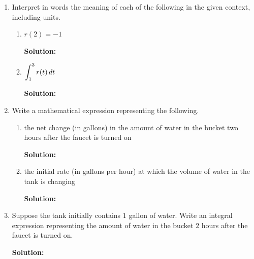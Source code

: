 \documentclass[10pt]{article}
\newcommand{\solution}{%
  \vspace{0.2in}%
  \noindent\textbf{\color{blue}Solution: }%
}
\begin{document}
\begin{enumerate}
\item[(a)] Interpret in words the meaning of each of the following in the given context, including units.
\begin{enumerate}
\item[i.] $r(2)=-1$

\solution
{}

\item[ii.] $\displaystyle \int_1^3 r(t)\,dt$

\solution
{}
\end{enumerate}

\item[(b)] Write a mathematical expression representing the following.
\begin{enumerate}
\item[i.] the net change (in gallons) in the amount of water in the bucket two hours after the faucet is turned on

\solution
\blue{
\[
\text{Net change from } t=0 \text{ to } t=2: \int_0^2 r(t)\, dt
\]
}

\item[ii.] the initial rate (in gallons per hour) at which the volume of water in the tank is changing   

\solution
\blue{
\[
r(0)
\]
}
\end{enumerate}

\item[(c)] Suppose the tank initially contains $1$ gallon of water. Write an integral expression representing the amount of water in the bucket $2$ hours after the faucet is turned on.

\solution
\blue{
\[
\text{Volume at } t=2: 1 + \int_0^2 r(t)\, dt
\]
}
\end{enumerate}
\end{document}
